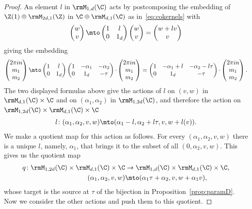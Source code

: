 \begin{proof}
An element $l$ in $\rmM_{1,d}(\C)$ acts by postcomposing the embedding
of $\Z(1)\oplus\rmM_{2d,1}(\Z)$ in $\C\oplus \rmM_{d,1}(\C)$ as
in~\eqref{eq:cokernels} with
\[
\begin{pmatrix}
w \\v
\end{pmatrix}
\mto
\begin{pmatrix}
1 & l\\0 &1_d
\end{pmatrix}
\begin{pmatrix}
w \\v
\end{pmatrix}
=
\begin{pmatrix}
w +lv\\v
\end{pmatrix}
\]
giving the embedding
\[
\begin{pmatrix}
2\pi in\\ m_1\\ m_2
\end{pmatrix}
 \mto
\begin{pmatrix}
1 & l\\0 & 1_d
\end{pmatrix}
\begin{pmatrix}
1 & -\alpha_1 & -\alpha_2\\0 & 1_d & -\tau
\end{pmatrix}{\cdot}
\begin{pmatrix}
2\pi in\\ m_1\\ m_2
\end{pmatrix} %
 =
\begin{pmatrix}
1 & -\alpha_1+l & -\alpha_2-l\tau\\0 & 1_d & -\tau
\end{pmatrix}{\cdot}
\begin{pmatrix}
2\pi in\\ m_1\\ m_2
\end{pmatrix}.
\]
The two displayed formulas above give the actions of $l$ on $(v,w)$ in
$\rmM_{d,1}(\C)\times\C$ and on $(\alpha_1,\alpha_2)$ in
$\rmM_{1,2d}(\C)$, and therefore the action on
$\rmM_{1,2d}(\C)\times\rmM_{d,1}(\C)\times\C$
\[
l\colon (\alpha_1,\alpha_2,v,w)\mto (\alpha_1-l,\alpha_2+l\tau,v,w+l(v)).
\]
We make a quotient map for this action as follows. For every
$(\alpha_1,\alpha_2,v,w)$ there is a unique $l$, namely, $\alpha_1$,
that brings it to the subset of all $(0,\alpha_2,v,w)$. This gives us
the quotient map
\[
\begin{aligned}
q\colon  \rmM_{1,2d}(\C)\times\rmM_{d,1}(\C)\times\C &\to
\rmM_{1,d}(\C)\times\rmM_{d,1}(\C)\times\C,\\
 (\alpha_1,\alpha_2,v,w)&\mto (\alpha_1\tau+\alpha_2,v,w+\alpha_1v),
\end{aligned}
\]
whose target is the source at $\tau$ of the bijection in Proposition~\ref{prop:paramD}.
Now we consider the other actions and push them to this quotient.


\end{proof}
